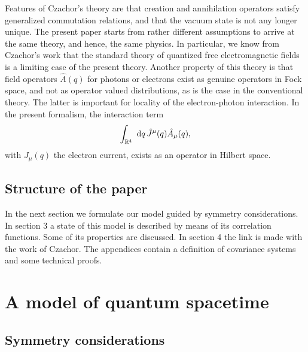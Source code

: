 \documentclass[12pt,a4paper]{article}
\def\Ro{{\mathbb R}}
\begin{document}
Features of Czachor's theory are that creation and annihilation
operators satisfy generalized commutation relations, and
that the vacuum state is not any longer unique.
The present paper starts from rather different assumptions
to arrive at the same theory, and hence,
the same physics.
In particular, we know from Czachor's work that
the standard theory of quantized free
electromagnetic fields is a limiting case of the present theory.
Another property of this theory is that field operators
$\hat A(q)$ for photons or electrons exist as genuine
operators in Fock space, and not as operator valued distributions,
as is the case in the conventional theory.
The latter is important for locality of
the electron-photon interaction. In the present formalism, the interaction term
\begin{equation}
\int_{\Ro^4}\hbox{ d}q\,\hat J^\mu(q) \hat A_\mu(q),
\end{equation}
with $J_\mu(q)$ the electron current,
exists as an operator in Hilbert space.


\subsection{Structure of the paper}

In the next section we formulate our model guided
by symmetry considerations. In section 3 a state of this model
is described by means of its correlation functions.
Some of its properties are discussed.
In section 4 the link is made with the work of Czachor.
The appendices contain a definition of covariance systems
and some technical proofs.

\section{A model of quantum spacetime}

\subsection{Symmetry considerations}
\end{document}
